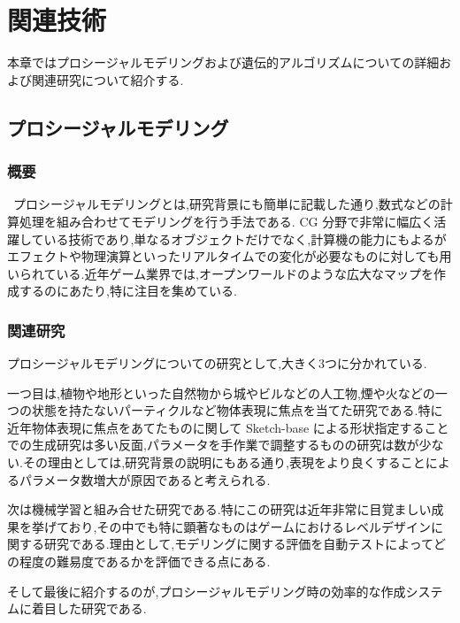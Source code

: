 \newpage

\chapter{関連技術}
本章ではプロシージャルモデリングおよび遺伝的アルゴリズムについての詳細および関連研究について紹介する.

\section{プロシージャルモデリング}
\subsection{概要}
\ プロシージャルモデリングとは,研究背景にも簡単に記載した通り,数式などの計算処理を組み合わせてモデリングを行う手法である. CG 分野で非常に幅広く活躍している技術であり,単なるオブジェクトだけでなく,計算機の能力にもよるがエフェクトや物理演算といったリアルタイムでの変化が必要なものに対しても用いられている.近年ゲーム業界では,オープンワールドのような広大なマップを作成するのにあたり,特に注目を集めている.

\subsection{関連研究}\label{label:relatedResearch}
プロシージャルモデリングについての研究として,大きく3つに分かれている.


一つ目は,植物\cite{lintermann1999interactive}や地形\cite{smelik2011declarative}といった自然物から城\cite{三浦嘉大2020地理的要素とユーザー自由度を考慮した日本城郭都市のプロシージャルモデリング}やビル\cite{muller2006procedural}などの人工物,煙\cite{xie2022dualsmoke}や火などの一つの状態を持たないパーティクルなど物体表現に焦点を当てた研究である.特に近年物体表現に焦点をあてたものに関して Sketch-base による形状指定することでの生成研究は多い反面,パラメータを手作業で調整するものの研究は数が少ない.その理由としては,研究背景の説明にもある通り,表現をより良くすることによるパラメータ数増大が原因であると考えられる.


次は機械学習と組み合せた研究\cite{DBLP:journals/corr/abs-2010-04548}である.特にこの研究は近年非常に目覚ましい成果を挙げており,その中でも特に顕著なものはゲームにおけるレベルデザインに関する研究である.理由として,モデリングに関する評価を自動テストによってどの程度の難易度であるかを評価できる点にある.


そして最後に紹介するのが,プロシージャルモデリング時の効率的な作成システムに着目した研究である.


